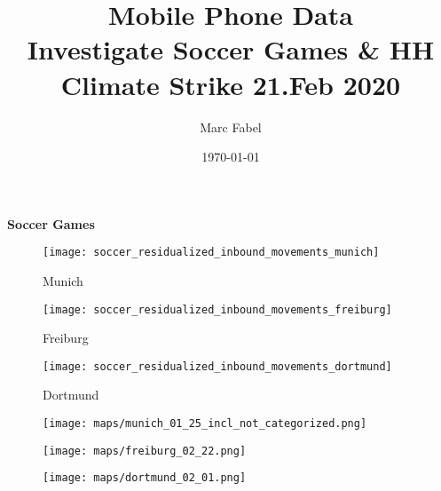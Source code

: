 \documentclass[11pt, a4paper]{article} %
\title{Mobile Phone Data \\ Investigate Soccer Games \& HH Climate Strike 21.Feb 2020}
\author{Marc Fabel}
\date{\monthyeardate\today}
\begin{document}
\vspace*{\fill}
{\Huge \begin{center}\textbf{Soccer Games}\end{center}}
\vspace*{\fill}\clearpage



\begin{figure}[H]\centering\caption{Munich}
	\texttt{[image: soccer\_residualized\_inbound\_movements\_munich]}
	\begin{minipage}{\linewidth}
	\end{minipage}
\end{figure}

\begin{figure}[H]\centering\caption{Freiburg}
	\texttt{[image: soccer\_residualized\_inbound\_movements\_freiburg]}
	\begin{minipage}{\linewidth}
	\end{minipage}
\end{figure}
\begin{figure}[H]\centering\caption{Dortmund}
	\texttt{[image: soccer\_residualized\_inbound\_movements\_dortmund]}
	\begin{minipage}{\linewidth}
	\end{minipage}
\end{figure}




\begin{figure}[H]\centering
	\texttt{[image: maps/munich\_01\_25\_incl\_not\_categorized.png]}
	\begin{minipage}{\linewidth}
	\end{minipage}
\end{figure}



\begin{figure}[H]\centering
	\texttt{[image: maps/freiburg\_02\_22.png]}
	\begin{minipage}{\linewidth}
	\end{minipage}
\end{figure}



\begin{figure}[H]\centering
	\texttt{[image: maps/dortmund\_02\_01.png]}
	\begin{minipage}{\linewidth}
	\end{minipage}
\end{figure}
\end{document}
